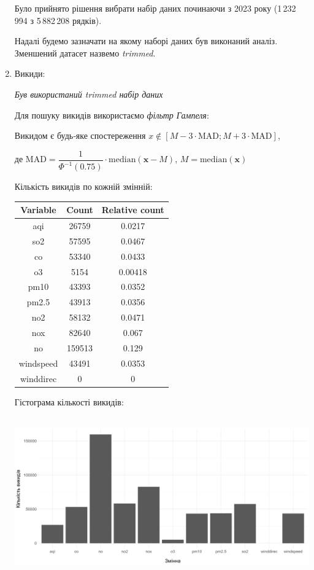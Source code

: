 \documentclass[./report.tex]{subfiles}
\begin{document}
\begin{enumerate}
    Було прийнято рішення вибрати набір даних починаючи з 2023 року 
    (1\,232\,994 з 5\,882\,208 рядків).

    Надалі будемо зазначати на якому наборі даних був виконаний аналіз. Зменшений
    датасет назвемо \textit{trimmed}.
    
    \item Викиди:

    \quad \textit{Був використаний trimmed набір даних}
    
    Для пошуку викидів використаємо \textit{фільтр Гампеля}:

    \begin{displayquote}
    Викидом є будь‑яке спостереження 
    $x \notin [M - 3 \cdot \text{MAD}; M + 3 \cdot \text{MAD}]$, 
    
    де $\text{MAD} = \dfrac{1}{\Phi^{-1}(0.75)} \cdot \text{median}(\pmb{x} - M)$,
    $M = \text{median}(\pmb{x})$
    \end{displayquote}

    Кількість викидів по кожній змінній:

    \begin{tabular}{ccc}
        \hline
        \textbf{Variable} & \textbf{Count} & \textbf{Relative count} \\
        \hline
        aqi        & 26759  & 0.0217  \\
        so2        & 57595  & 0.0467  \\
        co         & 53340  & 0.0433  \\
        o3         & 5154   & 0.00418 \\
        pm10       & 43393  & 0.0352  \\
        pm2.5      & 43913  & 0.0356  \\
        no2        & 58132  & 0.0471  \\
        nox        & 82640  & 0.067   \\
        no         & 159513 & 0.129   \\
        windspeed  & 43491  & 0.0353 \\
        winddirec  & 0      & 0       \\
    \end{tabular}

   \pagebreak
    
    Гістограма кількості викидів:

    \includegraphics[height=2.7in]{plots/outliers/count-bar.png}
    

\end{enumerate}
\end{document}
